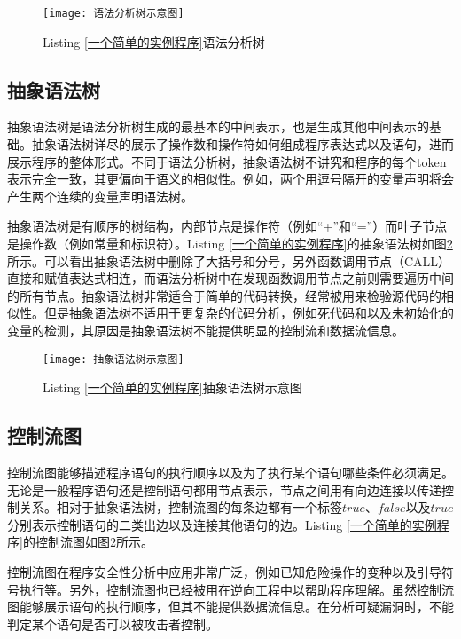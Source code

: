 \begin{figure}[htp]
\centering
\texttt{[image: 语法分析树示意图]}
\caption{Listing \ref{一个简单的实例程序}语法分析树}
\label{语法分析树示例}
\end{figure}

\subsection{抽象语法树}

抽象语法树是语法分析树生成的最基本的中间表示，也是生成其他中间表示的基础。抽象语法树详尽的展示了操作数和操作符如何组成程序表达式以及语句，进而展示程序的整体形式。不同于语法分析树，抽象语法树不讲究和程序的每个token表示完全一致，其更偏向于语义的相似性。例如，两个用逗号隔开的变量声明将会产生两个连续的变量声明语法树。

抽象语法树是有顺序的树结构，内部节点是操作符（例如“+”和“=”）而叶子节点是操作数（例如常量和标识符）。Listing \ref{一个简单的实例程序}的抽象语法树如图\ref{抽象语法树示意图}所示。可以看出抽象语法树中删除了大括号和分号，另外函数调用节点{（CALL）}直接和赋值表达式相连，而语法分析树中在发现函数调用节点之前则需要遍历中间的所有节点。抽象语法树非常适合于简单的代码转换，经常被用来检验源代码的相似性。但是抽象语法树不适用于更复杂的代码分析，例如死代码和以及未初始化的变量的检测，其原因是抽象语法树不能提供明显的控制流和数据流信息。


\begin{figure}[htp]
\centering
\texttt{[image: 抽象语法树示意图]}
\caption{Listing \ref{一个简单的实例程序}抽象语法树示意图}
\label{抽象语法树示意图}
\end{figure}

\subsection{控制流图}

控制流图能够描述程序语句的执行顺序以及为了执行某个语句哪些条件必须满足。无论是一般程序语句还是控制语句都用节点表示，节点之间用有向边连接以传递控制关系。相对于抽象语法树，控制流图的每条边都有一个标签$true$、$false$以及$true$分别表示控制语句的二类出边以及连接其他语句的边。Listing \ref{一个简单的实例程序}的控制流图如图\ref{抽象语法树示意图}所示。

控制流图在程序安全性分析中应用非常广泛，例如已知危险操作的变种以及引导符号执行等。另外，控制流图也已经被用在逆向工程中以帮助程序理解。虽然控制流图能够展示语句的执行顺序，但其不能提供数据流信息。在分析可疑漏洞时，不能判定某个语句是否可以被攻击者控制。

